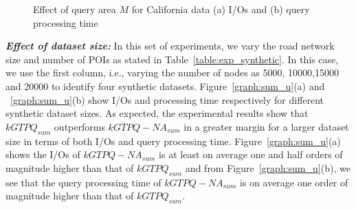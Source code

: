 \begin{figure}[htbp]
\begin{center}
\begin{tabular}{cc}
        \end{tabular}
    \caption{Effect of query area $M$ for California data (a) I/Os and (b) query processing time}
    \label{graph:sum_m}
  \end{center}
   \vspace{-6mm}
\end{figure}
\vspace*{10pt}


\textbf{\emph{Effect of dataset size: }}In this set of experiments, we vary the road network size and number of POIs as stated in Table~\ref{table:exp_synthetic}. In this case, we use the first column, i.e., varying the number of nodes as 5000,
10000,15000 and 20000 to identify four synthetic datasets. Figure~\ref{graph:sum_u}(a)
and ~\ref{graph:sum_u}(b) show I/Os and processing time respectively for
different synthetic dataset sizes. As expected, the experimental results show that
$kGTPQ_{sum}$ outperforms $kGTPQ-NA_{sum}$ in a greater margin for a larger dataset size in terms
of both I/Os and query processing time. Figure~\ref{graph:sum_u}(a) shows the I/Os of $kGTPQ-NA_{sum}$ is at least on average
one and half orders of magnitude higher than that of $kGTPQ_{sum}$ and from Figure~\ref{graph:sum_u}(b), we see that the query processing time of $kGTPQ-NA_{sum}$ is on average one order of magnitude higher than that of $kGTPQ_{sum}$.


